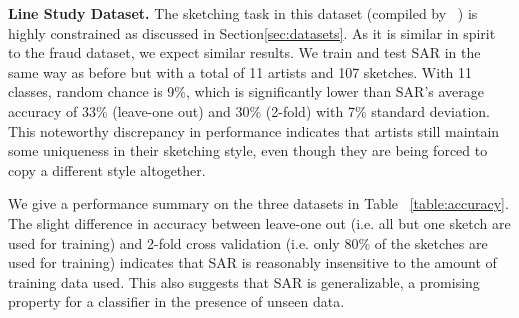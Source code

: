 



\noindent\textbf{Line Study Dataset.} The sketching task in this dataset (compiled by ~\cite{Cole:2008:PDL:1360612.1360687}) is highly constrained as discussed in Section\ref{sec:datasets}. As it is similar in spirit to the fraud dataset, we expect similar results. We train and test SAR in the same way as before but with a total of 11 artists and 107 sketches. With 11 classes, random chance is 9\%, which is significantly lower than SAR's average accuracy of 33\% (leave-one out) and 30\% (2-fold) with 7\% standard deviation. This noteworthy discrepancy in performance indicates that artists still maintain some uniqueness in their sketching style, even though they are being forced to copy a different style altogether.

We give a performance summary on the three datasets in Table ~\ref{table:accuracy}. The slight difference in accuracy between leave-one out (i.e. all but one sketch are used for training) and 2-fold cross validation (i.e. only 80\% of the sketches are used for training) indicates that SAR is reasonably insensitive to the amount of training data used. This also suggests that SAR is generalizable, a promising property for a classifier in the presence of unseen data.


